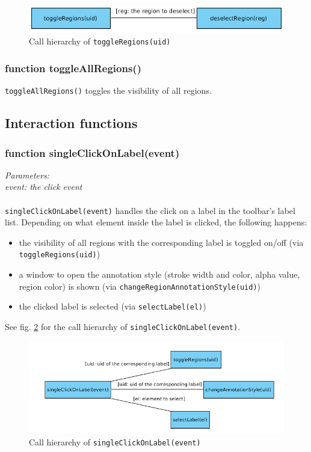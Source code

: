 \begin{figure}[H]
	\begin{center}
		\includegraphics[scale=0.5]{img/ch_toggleRegions.png}
		\caption{Call hierarchy of \texttt{toggleRegions(uid)}}
		\label{figB_toggleRegions}
	\end{center}
\end{figure}


\subsubsection{function toggleAllRegions()}
\texttt{toggleAllRegions()} toggles the visibility of all regions.


\subsection{Interaction functions}
\subsubsection{function singleClickOnLabel(event)}
\emph{Parameters:\\
	event: the click event\\ \\
}
\texttt{singleClickOnLabel(event)} handles the click on a label in the toolbar's label list. Depending on what element inside the label is clicked, the following happens:
\begin{itemize}
	\item the visibility of all regions with the corresponding label is toggled on/off (via \texttt{toggleRegions(uid)})
	\item a window to open the annotation style (stroke width and color, alpha value, region color) is shown (via \texttt{changeRegionAnnotationStyle(uid)})
	\item the clicked label is selected (via \texttt{selectLabel(el)})
\end{itemize}

See fig. \ref{figB_singleClickLabel} for the call hierarchy of \texttt{singleClickOnLabel(event)}.

\begin{figure}[H]
	\begin{center}
		\includegraphics[scale=0.5]{img/ch_singleClickLabel.png}
		\caption{Call hierarchy of \texttt{singleClickOnLabel(event)}}
		\label{figB_singleClickLabel}
	\end{center}
\end{figure}


